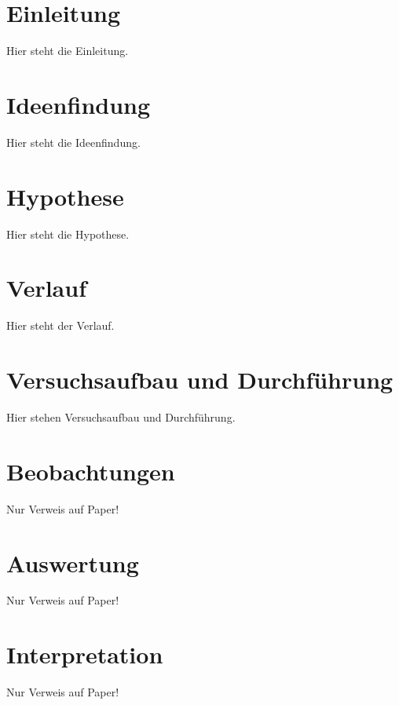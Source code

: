 \documentclass{Bericht}
\begin{document}
\maketitle


\tableofcontents
\clearpage

\section{Einleitung}
	Hier steht die Einleitung.

\section{Ideenfindung}
	Hier steht die Ideenfindung.

\section{Hypothese}
	Hier steht die Hypothese.

\section{Verlauf}
	Hier steht der Verlauf.

\section{Versuchsaufbau und Durchführung}
	Hier stehen Versuchsaufbau und Durchführung.

\section{Beobachtungen}
	Nur Verweis auf Paper!

\section{Auswertung}
	Nur Verweis auf Paper!

\section{Interpretation}
	Nur Verweis auf Paper!
\end{document}
